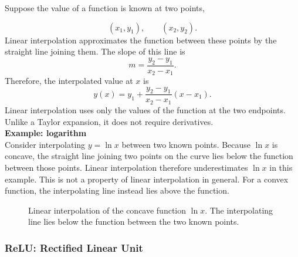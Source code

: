 Suppose the value of a function is known at two points,

\[
    (x_1,y_1), \qquad (x_2,y_2).
\]
Linear interpolation approximates the function between these points by the straight line joining them.
The slope of this line is
% 
\[
    m = \frac{y_2-y_1}{x_2-x_1}.
\]
% 
Therefore, the interpolated value at $x$ is
% 
\[
    \boxed{y(x) = y_1 + \frac{y_2-y_1}{x_2-x_1}(x-x_1).}
\]
% 
Linear interpolation uses only the values of the function at the two endpoints.
Unlike a Taylor expansion, it does not require derivatives.
% 
% 
\medskip
\\
\textbf{Example: logarithm}
\\
Consider interpolating $y=\ln x$ between two known points.
Because $\ln x$ is concave, the straight line joining two points on the curve lies below the function between those points.
Linear interpolation therefore underestimates $\ln x$ in this example.
This is not a property of linear interpolation in general.
For a convex function, the interpolating line instead lies above the function.

\begin{figure}[h]
    \centering
    \caption{Linear interpolation of the concave function $\ln x$.
    The interpolating line lies below the function between the two known points.}
\end{figure}


\subsubsection{ReLU: Rectified Linear Unit}


